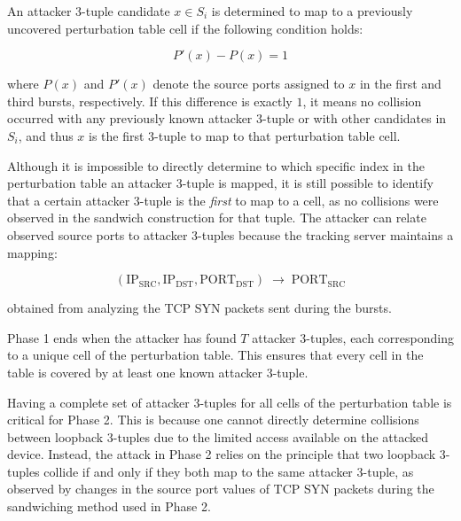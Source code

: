 \documentclass{report}
\begin{document}

An attacker 3-tuple candidate $x \in S_i$ is determined to map to a previously uncovered perturbation table cell if the following condition holds:

\[
	P'(x) - P(x) = 1
\]

where $P(x)$ and $P'(x)$ denote the source ports assigned to $x$ in the first and third bursts, respectively. If this difference is exactly $1$, it means no collision occurred with any previously known attacker 3-tuple or with other candidates in $S_i$, and thus $x$ is the first 3-tuple to map to that perturbation table cell.


Although it is impossible to directly determine to which specific index in the perturbation table an attacker 3-tuple is mapped, it is still possible to identify that a certain attacker 3-tuple is the \emph{first} to map to a cell, as no collisions were observed in the sandwich construction for that tuple. The attacker can relate observed source ports to attacker 3-tuples because the tracking server maintains a mapping:

\[
	(\mathrm{IP_{SRC}}, \mathrm{IP_{DST}}, \mathrm{PORT_{DST}}) \;\rightarrow\; \mathrm{PORT_{SRC}}
\]

obtained from analyzing the TCP SYN packets sent during the bursts.


Phase 1 ends when the attacker has found $T$ attacker 3-tuples, each corresponding to a unique cell of the perturbation table. This ensures that every cell in the table is covered by at least one known attacker 3-tuple.


Having a complete set of attacker 3-tuples for all cells of the perturbation table is critical for Phase 2. This is because one cannot directly determine collisions between loopback 3-tuples due to the limited access available on the attacked device. Instead, the attack in Phase 2 relies on the principle that two loopback 3-tuples collide if and only if they both map to the same attacker 3-tuple, as observed by changes in the source port values of TCP SYN packets during the sandwiching method used in Phase 2.
\end{document}
